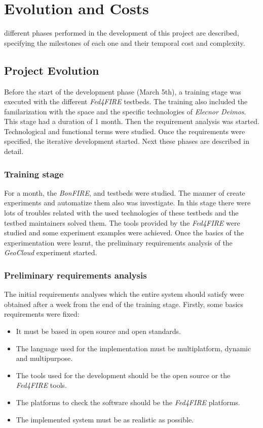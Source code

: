\chapter{Evolution and Costs}
\label{chap:evolution}
 different phases performed in the development of this project are described,
specifying the milestones of each one and their temporal cost and complexity.


\section{Project Evolution}
\label{section:evolution}

Before the start of the development phase (March 5th), a training stage was
executed with
the different \emph{Fed4FIRE} testbeds. The training also included the familarization
with the space and the specific technologies of \emph{Elecnor Deimos}. This
stage had a duration of 1 month. Then the
requirement analysis was started. Technological and functional terms were
studied. Once the requirements were specified, the iterative
development started. Next these phases are described in detail.

\subsection{Training stage}
For a month, the \emph{BonFIRE}, \pl and \vw testbeds were studied. The manner
of create experiments and automatize them also was investigate. In this stage there
were lots of troubles related with the used technologies of these testbeds and
the testbed maintainers solved them.
The tools provided by the \emph{Fed4FIRE} were studied and some experiment
examples were achieved. Once the basics of the experimentation were learnt, the
preliminary requirements analysis of the \emph{GeoCloud} experiment started.


\subsection{Preliminary requirements analysis}

The initial requirements analyses which the entire system should satisfy were
obtained after a week from the end of the training stage.
Firstly, some basics requirements were fixed:

\begin{itemize}
\item It must be based in open source and open standards.
\item The language used for the implementation must be multiplatform, dynamic
  and multipurpose.
\item The tools used for the development should be the open source or the \emph{Fed4FIRE} tools.
\item The platforms to check the software should be the \emph{Fed4FIRE}
  platforms.
\item The implemented system must be as realistic as possible.
\end{itemize}

